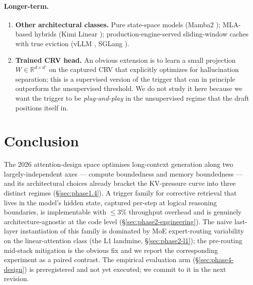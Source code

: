 \documentclass[11pt,letterpaper]{article}
\begin{document}
\paragraph{Longer-term.}
\begin{enumerate}[label=F\arabic*., resume, leftmargin=2.2em]
\item \textbf{Other architectural classes.} Pure state-space models
(Mamba2 \citep{TODO:mamba2}); MLA-based hybrids (Kimi Linear
\citep{TODO:kimi-linear}); production-engine-served sliding-window
caches with true eviction (vLLM \citep{TODO:vllm}, SGLang
\citep{TODO:sglang}).
\item \textbf{Trained CRV head.} An obvious extension is to learn a
small projection $W \in \mathbb{R}^{d \times d'}$ on the captured CRV
that explicitly optimizes for hallucination separation; this is a
supervised version of the trigger that can in principle outperform the
unsupervised threshold. We do not study it here because we want the
trigger to be \emph{plug-and-play} in the unsupervised regime that the
draft positions itself in.
\end{enumerate}

\section{Conclusion}

The 2026 attention-design space optimises long-context generation along
two largely-independent axes — compute boundedness and memory
boundedness — and its architectural choices already bracket the
KV-pressure curve into three distinct regimes (\S\ref{sec:phase1.4}).
A trigger family for corrective retrieval that lives in the model's
hidden state, captured per-step at logical reasoning boundaries, is
implementable with $\le 3\%$ throughput overhead and is genuinely
architecture-agnostic at the code level (\S\ref{sec:phase2-engineering}).
The naive last-layer instantiation of this family is dominated by MoE
expert-routing variability on the linear-attention class (the L1
landmine, \S\ref{sec:phase2-l1}); the pre-routing mid-stack mitigation
is the obvious fix and we report the corresponding experiment as a
paired contrast. The empirical evaluation arm
(\S\ref{sec:phase4-design}) is preregistered and not yet executed; we
commit to it in the next revision.

\appendix
\end{document}
